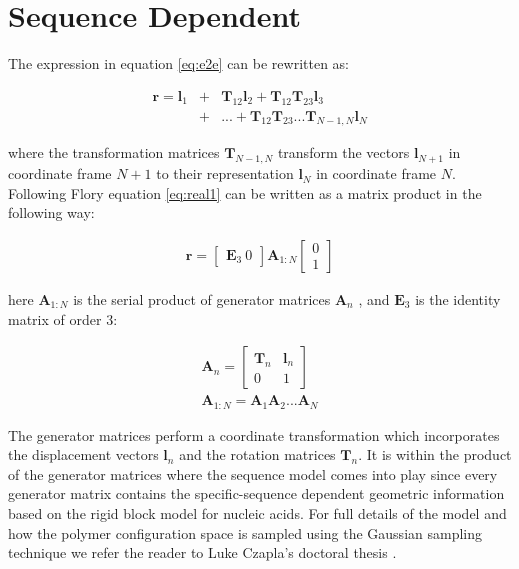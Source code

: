 \section{Sequence Dependent}
The expression in equation \ref{eq:e2e} can be rewritten as:

\begin{eqnarray}
\label{eq:real1}  
\textbf{r} = \textbf{l}_{1} & + & \textbf{T}_{12}\textbf{l}_{2}
+\textbf{T}_{12}\textbf{T}_{23}\textbf{l}_{3} \nonumber \\
 & + & ... + \textbf{T}_{12}\textbf{T}_{23}...\textbf{T}_{N-1,N} \textbf{l}_{N}
\end{eqnarray}

where the transformation matrices $\textbf{T}_{N-1,N}$ transform the
vectors $\textbf{l}_{N+1}$ in coordinate frame $N+1$ to their
representation $\textbf{l}_{N}$ in coordinate frame $N$.
Following Flory \cite{flory1969} equation \ref{eq:real1} can be
written as a matrix product in the following way:

\begin{gather}
\textbf{r}= \begin{bmatrix}\textbf{E}_{3}~ 0 \end{bmatrix} \textbf{A}_{1:N}\begin{bmatrix} 0 \\ 1 \end{bmatrix}
\end{gather}

here $\textbf{A}_{1:N}$ is the serial product of generator matrices
$\textbf{A}_{n}$ \cite{marky1994a}, and $\textbf{E}_{3}$ is the
identity matrix of order 3:

\begin{gather}
\textbf{A}_{n} =
\begin{bmatrix}
\textbf{T}_{n} & \textbf{l}_{n} \\
0 & 1
\end{bmatrix}\\
\textbf{A}_{1:N}=\textbf{A}_{1}\textbf{A}_{2}...\textbf{A}_{N}
\end{gather}

The  generator  matrices  perform  a coordinate  transformation  which
incorporates  the   displacement  vectors  $\textbf{l}_{n}$   and  the
rotation matrices  $\textbf{T}_{n}$. It is  within the product  of the
generator  matrices where  the sequence  model comes  into  play since
every  generator  matrix  contains  the  specific-sequence  dependent
geometric  information based  on  the rigid  block  model for  nucleic
acids.  For full details of the model and how the polymer configuration
space is  sampled using the  Gaussian sampling technique we  refer the
reader to Luke Czapla's doctoral thesis \cite{czapla2009}.




